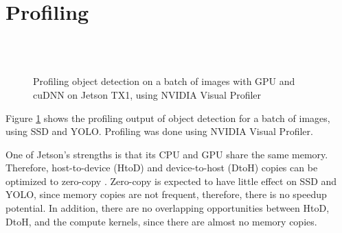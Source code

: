 \section{Profiling}
\label{sec:profiling}

\begin{figure}[t]
  \begin{center}
     \\
     \\
    \caption{Profiling object detection on a batch of images with GPU and cuDNN on Jetson TX1, using NVIDIA Visual Profiler}
    \label{fig:profile}
  \end{center}
\end{figure}

Figure \ref{fig:profile} shows the profiling output of object detection for a batch of images, using SSD and YOLO. Profiling was done using NVIDIA Visual Profiler.

One of Jetson's strengths is that its CPU and GPU share the same memory. Therefore, host-to-device (HtoD) and device-to-host (DtoH) copies can be optimized to zero-copy \cite{tegrazerocopy}. Zero-copy is expected to have little effect on SSD and YOLO, since memory copies are not frequent, therefore, there is no speedup potential. In addition, there are no overlapping opportunities between HtoD, DtoH, and the compute kernels, since there are almost no memory copies.

